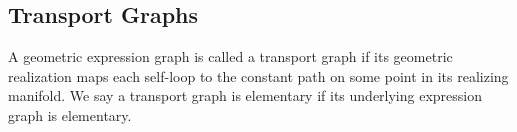 \documentclass[./Thick_TQFTs_and_Quantum_Information.tex]{subfiles}
\begin{document}
\subsection{Transport Graphs}

\begin{defn}
A geometric expression graph is called a transport graph if its geometric
realization maps each self-loop to the constant path on some point in its
realizing manifold. We say a transport graph is elementary if its underlying
expression graph is elementary.
\end{defn}
\end{document}
